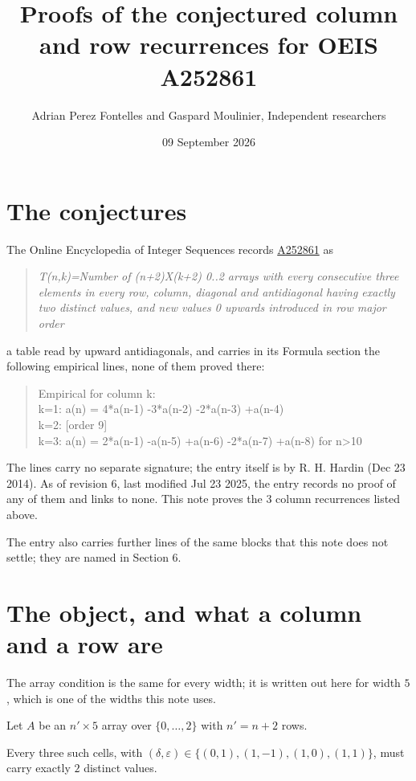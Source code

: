 \documentclass[11pt]{article}
\title{Proofs of the conjectured column and row recurrences for OEIS A252861}
\author{Adrian Perez Fontelles and Gaspard Moulinier, Independent researchers}
\date{09 September 2026}
\theoremstyle{definition}
\begin{document}
\maketitle
\section{The conjectures}

The Online Encyclopedia of Integer Sequences records \href{https://oeis.org/A252861}{A252861} as

\begin{quote}\itshape T(n,k)=Number of (n+2)X(k+2) 0..2 arrays with every consecutive three elements in every row, column, diagonal and antidiagonal having exactly two distinct values, and new values 0 upwards introduced in row major order\end{quote}

a table read by upward antidiagonals, and carries in its Formula section the following empirical lines, none of them proved there:

\begin{quote}\ttfamily Empirical for column k:\\
k=1: a(n) = 4*a(n-1) -3*a(n-2) -2*a(n-3) +a(n-4)\\k=2: [order 9]\\k=3: a(n) = 2*a(n-1) -a(n-5) +a(n-6) -2*a(n-7) +a(n-8) for n>10\end{quote}

The lines carry no separate signature; the entry itself is by R. H. Hardin (Dec 23 2014). As of revision 6, last modified Jul 23 2025, the entry records no proof of any of them and links to none. This note proves the 3 column recurrences listed above.

The entry also carries further lines of the same blocks that this note does not settle; they are named in Section 6.

\section{The object, and what a column and a row are}

The array condition is the same for every width; it is written out here for width $5$, which is one of the widths this note uses.

Let $A$ be an $n' \times 5$ array over $\{0,\dots,2\}$ with $n' = n + 2$ rows.

Every three such cells, with $(\delta,\varepsilon) \in \{(0,1), (1,-1), (1,0), (1,1)\}$, must carry exactly $2$ distinct values.
\end{document}
